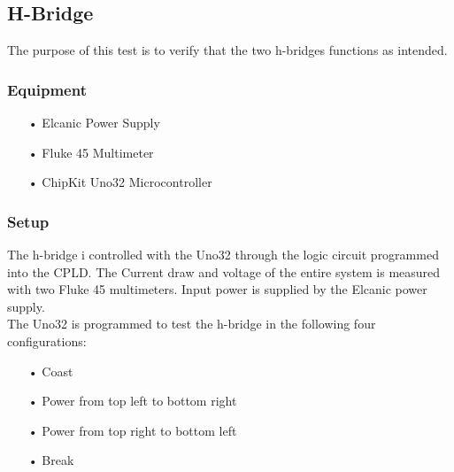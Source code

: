 \subsection{H-Bridge}
The purpose of this test is to verify that the two h-bridges functions as intended.

\subsubsection{Equipment}
\begin{enumerate}
	\item[•]Elcanic Power Supply
	\item[•]Fluke 45 Multimeter
	\item[•]ChipKit Uno32 Microcontroller
\end{enumerate}

\subsubsection{Setup}
The h-bridge i controlled with the Uno32 through the logic circuit programmed into the CPLD. The Current draw and voltage of the entire system is measured with two Fluke 45 multimeters. Input power is supplied by the Elcanic power supply.\\
The Uno32 is programmed to test the h-bridge in the following four configurations:
\begin{enumerate}
	\item[•]Coast
	\item[•]Power from top left to bottom right
	\item[•]Power from top right to bottom left
	\item[•]Break
\end{enumerate}

